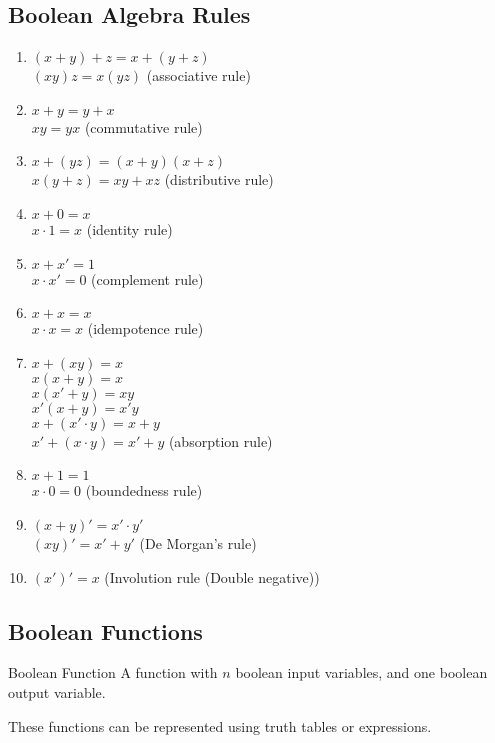 \documentclass[../notes.tex]{subfiles}
\begin{document}
			\subsection{Boolean Algebra Rules}
				\begin{enumerate}[label=(\alph*), labelsep=2.5em, leftmargin=*]
					\item $(x + y) + z = x + (y + z)$\\
						$(xy)z = x(yz)$ \hfill (associative rule)
					\item $x + y = y + x$\\
						$xy = yx$ \hfill (commutative rule)
					\item $x + (yz) = (x + y)(x + z)$\\
						$x(y + z) = xy + xz$ \hfill (distributive rule)
					\item $x + 0 = x$\\
						$x \cdot 1 = x$ \hfill (identity rule)
					\item $x + x' = 1$\\
						$x \cdot x' = 0$ \hfill (complement rule)
					\item $x + x = x$\\
						$x \cdot x = x$ \hfill (idempotence rule)
					\item $x + (xy) = x$\\
						$x (x + y) = x$\\
						$x (x' + y) = xy$\\
						$x'(x + y) = x'y$\\
						$x + (x' \cdot y) = x + y$\\
						$x' + (x \cdot y) = x' + y$ \hfill (absorption rule)
					\item $x + 1 = 1$\\
						$x \cdot 0 = 0$ \hfill (boundedness rule)
					\item $(x + y)' = x' \cdot y'$\\
						$(xy)' = x' + y'$ \hfill (De Morgan's rule)
					\item $\left(x'\right)' = x$ \hfill (Involution rule (Double negative))
				\end{enumerate}
			\subsection{Boolean Functions}
				\begin{definition}{Boolean Function}
					A function with $n$ boolean input variables, and one boolean output variable.
					\begin{indentparagraph}
						These functions can be represented using truth tables or expressions.
					\end{indentparagraph}
				\end{definition}
\end{document}
